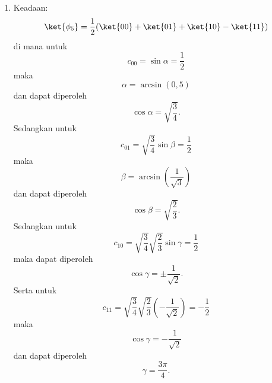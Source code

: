 \begin{enumerate}
	\item Keadaan:
	\begin{equation}
		\ket{\phi_5}=\frac{1}{2}(\ket{00}+\ket{01}+\ket{10}-\ket{11}) \label{keadaan5,2qubit}
	\end{equation}
	di mana untuk
	\begin{equation*}
		c_{00}=\sin\alpha=\frac{1}{2}
	\end{equation*}
	maka
	\begin{equation*}
		\alpha=\arcsin(0,5)
	\end{equation*}
	dan dapat diperoleh
	\begin{equation*}
		\cos\alpha=\sqrt{\frac{3}{4}}.
	\end{equation*}
	Sedangkan untuk
	\begin{equation*}
		c_{01}=\sqrt{\frac{3}{4}}\sin\beta=\frac{1}{2}
	\end{equation*}
	maka
	\begin{equation*}
		\beta=\arcsin(\frac{1}{\sqrt{3}})
	\end{equation*}
	dan dapat diperoleh
	\begin{equation*}
		\cos\beta=\sqrt{\frac{2}{3}}.
	\end{equation*}
	Sedangkan untuk
	\begin{equation*}
		c_{10}=\sqrt{\frac{3}{4}}\sqrt{\frac{2}{3}}\sin\gamma=\frac{1}{2}
	\end{equation*}
	maka dapat diperoleh
	\begin{equation*}
		\cos\gamma=\pm\frac{1}{\sqrt{2}}.
	\end{equation*}
	Serta untuk
	\begin{equation*}
		c_{11}=\sqrt{\frac{3}{4}}\sqrt{\frac{2}{3}}(-\frac{1}{\sqrt{2}})=-\frac{1}{2}
	\end{equation*}
	maka
	\begin{equation*}
		\cos\gamma=-\frac{1}{\sqrt{2}}
	\end{equation*}
	dan dapat diperoleh
	\begin{equation*}
		\gamma=\frac{3\pi}{4}.
	\end{equation*}
	

\end{enumerate}
